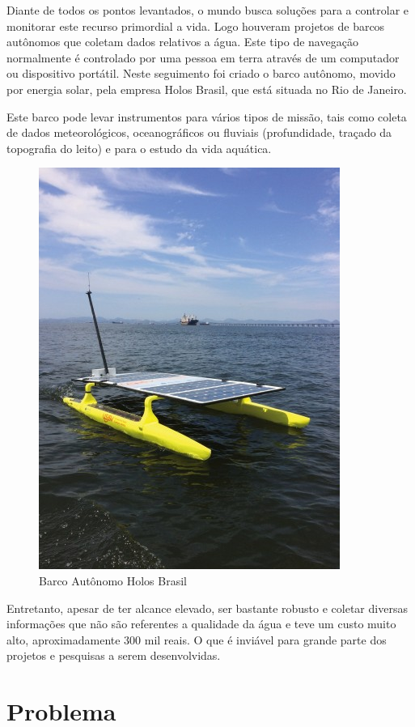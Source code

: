 Diante de todos os pontos levantados, o mundo busca soluções para a controlar e monitorar este recurso primordial a vida. Logo houveram projetos de barcos autônomos que coletam dados relativos a água. Este tipo de navegação normalmente é controlado por uma pessoa em terra através de um computador ou dispositivo portátil. Neste seguimento foi criado o barco autônomo, movido por energia solar, pela empresa Holos Brasil, que está situada no Rio de Janeiro. 

Este barco pode levar instrumentos para vários tipos de missão, tais como coleta de dados meteorológicos, oceanográficos ou fluviais (profundidade, traçado da topografia do leito) e para o estudo da vida aquática. 

 \begin{figure} [!htp]
	\centering
	\includegraphics[scale=0.5]{figuras/barcoINTRODUCAO}
	\caption{Barco Autônomo Holos Brasil}
	\label{barcoINTRODUCAO}
\end{figure}

Entretanto, apesar de ter alcance elevado, ser bastante robusto e coletar diversas informações que não são referentes a qualidade da água e teve um custo muito alto, aproximadamente 300 mil reais. O que é inviável para grande parte dos projetos e pesquisas a serem desenvolvidas.


\section{Problema}

